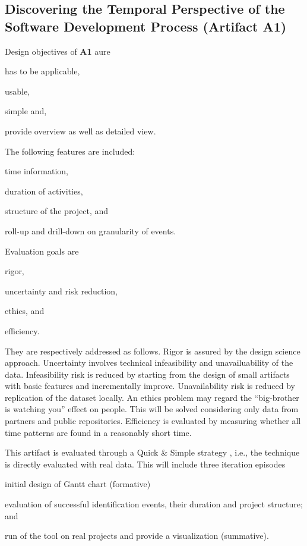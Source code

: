 \subsection{Discovering the Temporal Perspective of the Software Development Process (Artifact A1)} 
Design objectives of \textbf{A1} aure \begin{iiilist}
	\item has to be applicable, 
	\item usable, 
	\item simple and,
	\item provide overview as well as detailed view.
\end{iiilist} 
The following features are included: 
\begin{iiilist}
	\item time information,
	\item duration of activities,
	\item structure of the project, and
	\item roll-up and drill-down on granularity of events.
\end{iiilist}
Evaluation goals are 
\begin{iiilist}
	\item rigor,
	\item uncertainty and risk reduction,
	\item ethics, and
	\item efficiency.
\end{iiilist}
They are respectively addressed as follows. Rigor is assured by the design science approach. Uncertainty involves technical infeasibility and unavailuability of the data. Infeasibility risk is reduced by starting from the design of small artifacts with basic features and incrementally improve. Unavailability risk is reduced by replication of the dataset locally. An ethics problem may regard the “big-brother is watching you” effect on people. This will be solved considering only data from partners and public repositories. Efficiency is evaluated by measuring whether all time patterns are found in a reasonably short time.

This artifact is evaluated through a Quick \& Simple strategy \citep{Venable2016}, i.e., the technique is directly evaluated with real data. This will include three iteration episodes 
\begin{iiilist}
	\item initial design of Gantt chart (formative)
	\item evaluation of successful identification events, their duration and project structure; and 
	\item run of the tool on real projects and provide a visualization (summative).
\end{iiilist}



